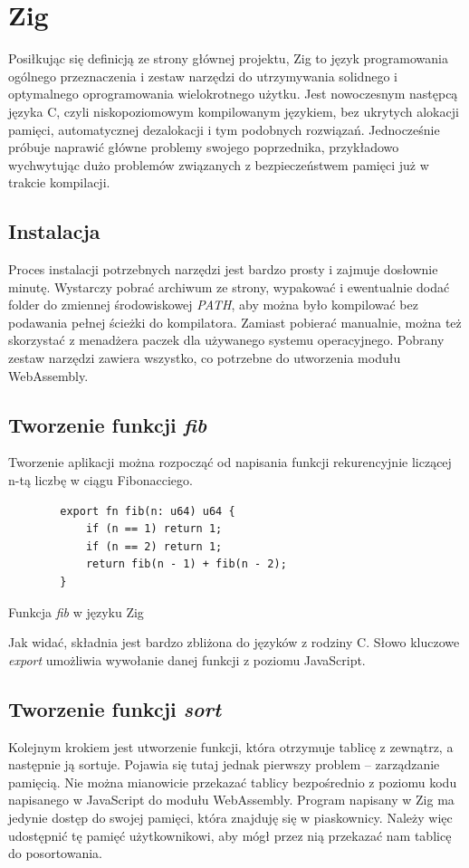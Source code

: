 \documentclass[language=polish,type=master]{aghmodern}
\begin{document}
\section{Zig}
Posiłkując się definicją ze strony głównej projektu\footnotemark{}, Zig to język programowania ogólnego przeznaczenia i zestaw narzędzi do utrzymywania solidnego i optymalnego oprogramowania wielokrotnego użytku.
Jest nowoczesnym następcą języka C, czyli niskopoziomowym kompilowanym językiem, bez ukrytych alokacji pamięci, automatycznej dezalokacji i tym podobnych rozwiązań.
Jednocześnie próbuje naprawić główne problemy swojego poprzednika, przykładowo wychwytując dużo problemów związanych z bezpieczeństwem pamięci już w trakcie kompilacji.

\subsection{Instalacja}
Proces instalacji potrzebnych narzędzi jest bardzo prosty i zajmuje dosłownie minutę.
Wystarczy pobrać archiwum ze strony, wypakować i ewentualnie dodać folder do zmiennej środowiskowej \emph{PATH}, aby można było kompilować bez podawania pełnej ścieżki do kompilatora.
Zamiast pobierać manualnie, można też skorzystać z menadżera paczek dla używanego systemu operacyjnego.
Pobrany zestaw narzędzi zawiera wszystko, co potrzebne do utworzenia modułu WebAssembly.

\subsection{Tworzenie funkcji \emph{fib}}
Tworzenie aplikacji można rozpocząć od napisania funkcji rekurencyjnie liczącej n-tą liczbę w ciągu Fibonacciego.

\begin{listing}[H]
    \begin{verbatim}
        export fn fib(n: u64) u64 {
            if (n == 1) return 1;
            if (n == 2) return 1;
            return fib(n - 1) + fib(n - 2);
        }
    \end{verbatim}
    \caption{Funkcja \emph{fib} w języku Zig}
\end{listing}

Jak widać, składnia jest bardzo zbliżona do języków z rodziny C.
Słowo kluczowe \emph{export} umożliwia wywołanie danej funkcji z poziomu JavaScript.

\subsection{Tworzenie funkcji \emph{sort}}
Kolejnym krokiem jest utworzenie funkcji, która otrzymuje tablicę z zewnątrz, a następnie ją sortuje.
Pojawia się tutaj jednak pierwszy problem -- zarządzanie pamięcią.
Nie można mianowicie przekazać tablicy bezpośrednio z poziomu kodu napisanego w JavaScript do modułu WebAssembly.
Program napisany w Zig ma jedynie dostęp do swojej pamięci, która znajduję się w piaskownicy.
Należy więc udostępnić tę pamięć użytkownikowi, aby mógł przez nią przekazać nam tablicę do posortowania.
\end{document}
